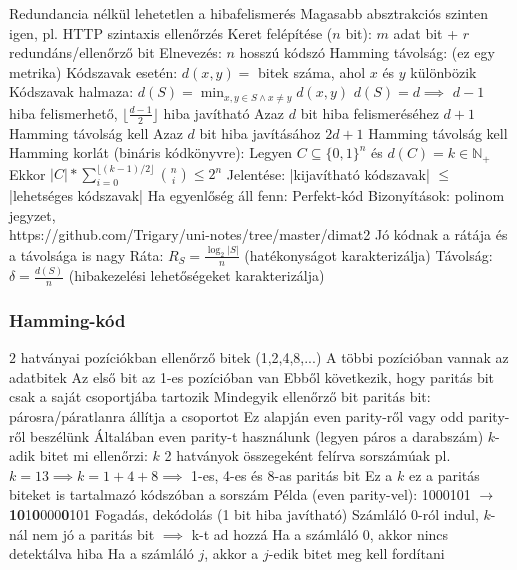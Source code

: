 \documentclass[12pt,a4paper]{article}
\begin{document}
\begin{outline}
	\1 Redundancia nélkül lehetetlen a hibafelismerés
		\2 Magasabb absztrakciós szinten igen, pl. HTTP szintaxis ellenőrzés
	\1 Keret felépítése ($n$ bit): $m$ adat bit + $r$ redundáns/ellenőrző bit
		\2 Elnevezés: $n$ hosszú kódszó
	\1 Hamming távolság: (ez egy metrika)
		\2 Kódszavak esetén: $d(x,y) = $ bitek száma, ahol $x$ és $y$ különbözik
		\2 Kódszavak halmaza: $d(S)= \min_{x,y \in S \wedge x \ne y} d(x,y)$
	\1 $d(S)=d \implies$ $d-1$ hiba felismerhető, $\lfloor \frac{d-1}{2} \rfloor$ hiba javítható
		\2 Azaz $d$ bit hiba felismeréséhez $d+1$ Hamming távolság kell
		\2 Azaz $d$ bit hiba javításához $2d+1$ Hamming távolság kell
	\1 Hamming korlát (bináris kódkönyvre):
		\2 Legyen $C \subseteq \{0,1\}^n$ és $d(C)=k \in \mathbb{N}_+$
		\2 Ekkor $|C| * \sum_{i=0}^{\lfloor (k-1)/2 \rfloor}\binom{n}{i} \le 2^n$
		\2 Jelentése: |kijavítható kódszavak| $\le$ |lehetséges kódszavak|
		\2 Ha egyenlőség áll fenn: Perfekt-kód
		\2 Bizonyítások: polinom jegyzet,\\
		https://github.com/Trigary/uni-notes/tree/master/dimat2
	\1 Jó kódnak a rátája és a távolsága is nagy
		\2 Ráta: $R_S=\frac{\log_2 |S|}{n}$ (hatékonyságot karakterizálja)
		\2 Távolság: $\delta = \frac{d(S)}{n}$ (hibakezelési lehetőségeket karakterizálja)
\end{outline}

\pagebreak

\subsubsection{Hamming-kód}

\begin{outline}
	\1 $2$ hatványai pozíciókban ellenőrző bitek (1,2,4,8,...)
		\2 A többi pozícióban vannak az adatbitek
		\2 Az első bit az 1-es pozícióban van
		\2 Ebből következik, hogy paritás bit csak a saját csoportjába tartozik
	\1 Mindegyik ellenőrző bit paritás bit: párosra/páratlanra állítja a csoportot
		\2 Ez alapján even parity-ről vagy odd parity-ről beszélünk
		\2 Általában even parity-t használunk (legyen páros a darabszám)
	\1 $k$-adik bitet mi ellenőrzi: $k$ 2 hatványok összegeként felírva sorszámúak
		\2 pl. $k=13 \implies k=1+4+8 \implies$ 1-es, 4-es és 8-as paritás bit
		\2 Ez a $k$ ez a paritás biteket is tartalmazó kódszóban a sorszám
	\1 Példa (even parity-vel): 1000101 $\to$ \textbf{1}\textbf{0}1\textbf{0}000\textbf{0}101
	\1 Fogadás, dekódolás (1 bit hiba javítható)
		\2 Számláló 0-ról indul, $k$-nál nem jó a paritás bit $\implies$ k-t ad hozzá
		\2 Ha a számláló 0, akkor nincs detektálva hiba
		\2 Ha a számláló $j$, akkor a $j$-edik bitet meg kell fordítani
\end{outline}
\end{document}
